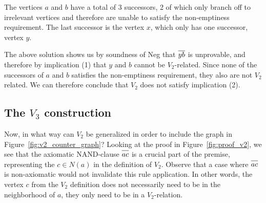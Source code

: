 The vertices $a$ and $b$ have a total of 3 successors, 2 of which only branch off to irrelevant vertices and therefore are unable to satisfy the non-emptiness requirement.
The last successor is the vertex $x$, which only has one successor, vertex $y$.\par
\begin{figure}[!h]
  \centering
  \caption{}
  \label{fig:v2_counter_assignment}
\end{figure}
\FloatBarrier
The above solution shows us by soundness of Neg that $\ol{yb}$ is unprovable, and therefore by implication (1) that $y$ and $b$ cannot be $V_2$-related.
Since none of the successors of $a$ and $b$ satisfies the non-emptiness requirement, they also are not $V_2$ related.
We can therefore conclude that $V_2$ does not satisfy implication (2).

\subsection{The $V_3$ construction}
\label{sub:The V3 construction}
Now, in what way can $V_2$ be generalized in order to include the graph in Figure~\ref{fig:v2_counter_graph}?
Looking at the proof in Figure~\ref{fig:proof_v2}, we see that the axiomatic NAND-clause $\ol{ac}$ is a crucial part of the premise, representing the $c \in N(a)$ in the definition of $V_2$.
Observe that a case where $\ol{ac}$ is non-axiomatic would not invalidate this rule application.
In other words, the vertex $c$ from the $V_2$ definition does not necessarily need to be in the neighborhood of $a$, they only need to be in a $V_2$-relation.

